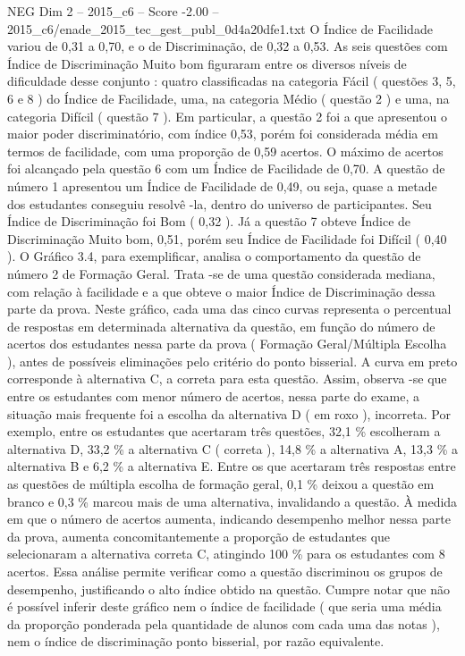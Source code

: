 \begin{textsample}{NEG Dim 2 – 2015\_c6 – Score -2.00 – 2015\_c6/enade\_2015\_tec\_gest\_publ\_0d4a20dfe1.txt}
O Índice de Facilidade variou de 0,31 a 0,70, e o de Discriminação, de 0,32 a 0,53.
As seis questões com Índice de Discriminação Muito bom figuraram entre os diversos níveis de dificuldade desse conjunto : quatro classificadas na categoria Fácil ( questões 3, 5, 6 e 8 ) do Índice de Facilidade, uma, na categoria Médio ( questão 2 ) e uma, na categoria Difícil ( questão 7 ).
Em particular, a questão 2 foi a que apresentou o maior poder discriminatório, com índice 0,53, porém foi considerada média em termos de facilidade, com uma proporção de 0,59 acertos.
O máximo de acertos foi alcançado pela questão 6 com um Índice de Facilidade de 0,70.
A questão de número 1 apresentou um Índice de Facilidade de 0,49, ou seja, quase a metade dos estudantes conseguiu resolvê -la, dentro do universo de participantes.
Seu Índice de Discriminação foi Bom ( 0,32 ).
Já a questão 7 obteve Índice de Discriminação Muito bom, 0,51, porém seu Índice de Facilidade foi Difícil ( 0,40 ).
O Gráfico 3.4, para exemplificar, analisa o comportamento da questão de número 2 de Formação Geral.
Trata -se de uma questão considerada mediana, com relação à facilidade e a que obteve o maior Índice de Discriminação dessa parte da prova.
Neste gráfico, cada uma das cinco curvas representa o percentual de respostas em determinada alternativa da questão, em função do número de acertos dos estudantes nessa parte da prova ( Formação Geral/Múltipla Escolha ), antes de possíveis eliminações pelo critério do ponto bisserial.
A curva em preto corresponde à alternativa C, a correta para esta questão.
Assim, observa -se que entre os estudantes com menor número de acertos, nessa parte do exame, a situação mais frequente foi a escolha da alternativa D ( em roxo ), incorreta.
Por exemplo, entre os estudantes que acertaram três questões, 32,1 \% escolheram a alternativa D, 33,2 \% a alternativa C ( correta ), 14,8 \% a alternativa A, 13,3 \% a alternativa B e 6,2 \% a alternativa E.
Entre os que acertaram três respostas entre as questões de múltipla escolha de formação geral, 0,1 \% deixou a questão em branco e 0,3 \% marcou mais de uma alternativa, invalidando a questão.
À medida em que o número de acertos aumenta, indicando desempenho melhor nessa parte da prova, aumenta concomitantemente a proporção de estudantes que selecionaram a alternativa correta C, atingindo 100 \% para os estudantes com 8 acertos.
Essa análise permite verificar como a questão discriminou os grupos de desempenho, justificando o alto índice obtido na questão.
Cumpre notar que não é possível inferir deste gráfico nem o índice de facilidade ( que seria uma média da proporção ponderada pela quantidade de alunos com cada uma das notas ), nem o índice de discriminação ponto bisserial, por razão equivalente.

\end{textsample}
